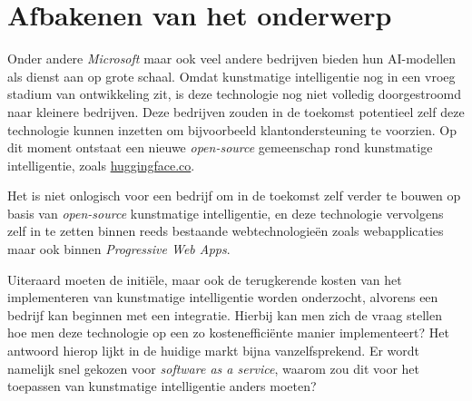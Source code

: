 \bigbreak{}

\section{Afbakenen van het onderwerp}

Onder andere \textit{Microsoft} maar ook veel andere bedrijven bieden hun AI-modellen als dienst aan op grote schaal. Omdat kunstmatige intelligentie nog in een vroeg stadium van ontwikkeling zit, is deze technologie nog niet volledig doorgestroomd naar kleinere bedrijven. Deze bedrijven zouden in de toekomst potentieel zelf deze technologie kunnen inzetten om bijvoorbeeld klant\-on\-der\-steu\-ning te voorzien. Op dit moment ontstaat een nieuwe \textit{open-source} gemeenschap rond kunstmatige intelligentie, zoals \href{https://huggingface.co/}{huggingface.co}.

\bigbreak{}

Het is niet onlogisch voor een bedrijf om in de toekomst zelf verder te bouwen op basis van \textit{open-source} kunstmatige intelligentie, en deze technologie vervolgens zelf in te zetten binnen reeds bestaande webtechnologieën zoals web\-app\-li\-ca\-ties maar ook binnen \textit{Progressive Web Apps}.

\bigbreak{}

Uiteraard moeten de initiële, maar ook de terugkerende kosten van het implementeren van kunstmatige intelligentie worden onderzocht, alvorens een bedrijf kan beginnen met een integratie. Hierbij kan men zich de vraag stellen hoe men deze technologie op een zo kostenefficiënte manier implementeert? Het antwoord hierop lijkt in de huidige markt bijna vanzelfsprekend. Er wordt namelijk snel gekozen voor \textit{software as a service}, waarom zou dit voor het toepassen van kunstmatige intelligentie anders moeten?

\section{}%
\label{sec:probleemstelling}


